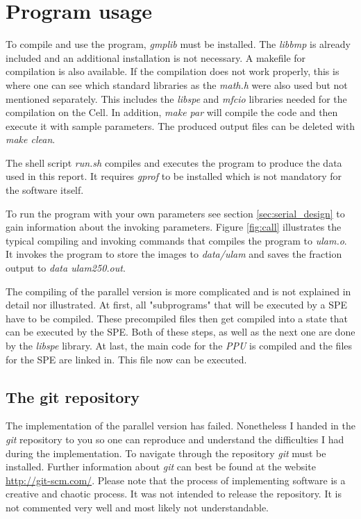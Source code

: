 \section{Program usage}
\label{sec:usage}

To compile and use the program, \emph{gmplib} must be installed. The \emph{libbmp} is already included and an additional installation is not necessary. A makefile for compilation is also available. If the compilation does not work properly, this is where one can see which standard libraries as the \emph{math.h} were also used but not mentioned separately. This includes the \emph{libspe} and \emph{mfcio} libraries needed for the compilation on the Cell. In addition, \emph{make par} will compile the code and then execute it with sample parameters. The produced output files can be deleted with \emph{make clean}.

The shell script \emph{run.sh} compiles and executes the program to produce the data used in this report. It requires \emph{gprof} to be installed which is not mandatory for the software itself.

To run the program with your own parameters see section \ref{sec:serial_design} to gain information about the invoking parameters. Figure \ref{fig:call} illustrates the typical compiling and invoking commands that compiles the program to \emph{ulam.o}. It invokes the program to store the images to \emph{data/ulam} and saves the fraction output to \emph{data ulam250.out}.


The compiling of the parallel version is more complicated and is not explained in detail nor illustrated. At first, all "subprograms" that will be executed by a SPE have to be compiled. These precompiled files then get compiled into a state that can be executed by the SPE. Both of these steps, as well as the next one are done by the \emph{libspe} library. At last, the main code for the \emph{PPU} is compiled and the files for the SPE are linked in. This file now can be executed.

\subsection{The git repository}
The implementation of the parallel version has failed. Nonetheless I handed in the \emph{git} repository to you so one can reproduce and understand the difficulties I had during the implementation. To navigate through the repository \emph{git} must be installed. Further information about \emph{git} can best be found at the website \url{http://git-scm.com/}.
Please note that the process of implementing software is a creative and chaotic process. It was not intended to release the repository. It is not commented very well and most likely not understandable.

